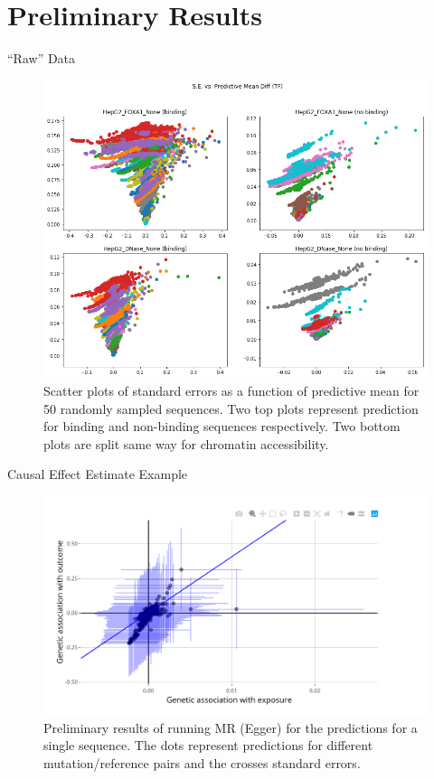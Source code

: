 \documentclass[pdf]{beamer} %
\begin{document}
\section{Preliminary Results}
\begin{frame}[t]{``Raw'' Data}
    \begin{figure}[htpb]
        \centering
        \includegraphics[scale=0.2]{figures/se_vs_predictive_mean_diff}
        \caption{Scatter plots of standard errors as a function of predictive mean for 50 randomly sampled sequences. Two top plots represent prediction for binding and non-binding sequences respectively. Two bottom plots are split same way for chromatin accessibility.}
        \label{fig:se_vs_predictive_mean_diff}
    \end{figure} 
\end{frame}

\begin{frame}[t]{Causal Effect Estimate Example}
    \begin{figure}[htpb]
        \centering
        \includegraphics[scale=.15]{figures/egger_prelim_results}
        \caption{Preliminary results of running MR (Egger) for the predictions for a single sequence. The dots represent predictions for different mutation/reference pairs and the crosses standard errors.}
        \label{fig:egger_results_prelim}
    \end{figure} 
\end{frame}
\end{document}
